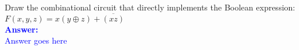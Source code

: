 \item{}
Draw the combinational circuit that directly implements the Boolean expression:\\[6pt]
$F(x,y,z)=x(y\oplus z)+\overline{(xz)}$\\[12pt]
\ifanswers
\textcolor{blue}{
\textbf{Answer:}\\[12pt]
Answer goes here
}
\newpage
\fi

